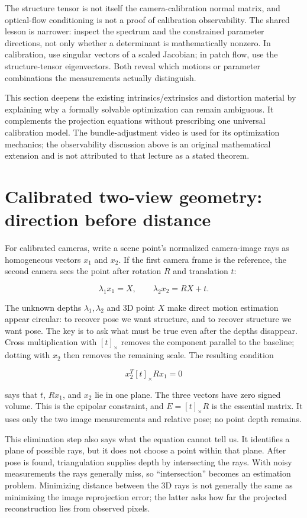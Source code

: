 The structure tensor is not itself the camera-calibration normal matrix, and optical-flow conditioning is not a proof of calibration observability. The shared lesson is narrower: inspect the spectrum and the constrained parameter directions, not only whether a determinant is mathematically nonzero. In calibration, use singular vectors of a scaled Jacobian; in patch flow, use the structure-tensor eigenvectors. Both reveal which motions or parameter combinations the measurements actually distinguish.

This section deepens the existing intrinsics/extrinsics and distortion material by explaining why a formally solvable optimization can remain ambiguous. It complements the projection equations without prescribing one universal calibration model. The bundle-adjustment video is used for its optimization mechanics; the observability discussion above is an original mathematical extension and is not attributed to that lecture as a stated theorem.

\section{Calibrated two-view geometry: direction before distance}\label{02-foundations-ii-ch036-calibrated-two-view-geometry-direction-before-distance}

For calibrated cameras, write a scene point's normalized camera-image rays as homogeneous vectors \(x_1\) and \(x_2\). If the first camera frame is the reference, the second camera sees the point after rotation \(R\) and translation \(t\):

\[\lambda_1x_1=X,\qquad \lambda_2x_2=RX+t.\]

The unknown depths \(\lambda_1,\lambda_2\) and 3D point \(X\) make direct motion estimation appear circular: to recover pose we want structure, and to recover structure we want pose. The key is to ask what must be true even after the depths disappear. Cross multiplication with \([t]_\times\) removes the component parallel to the baseline; dotting with \(x_2\) then removes the remaining scale. The resulting condition

\[x_2^T[t]_\times R x_1=0\]

says that \(t\), \(Rx_1\), and \(x_2\) lie in one plane. The three vectors have zero signed volume. This is the epipolar constraint, and \(E=[t]_\times R\) is the essential matrix. It uses only the two image measurements and relative pose; no point depth remains.

This elimination step also says what the equation cannot tell us. It identifies a plane of possible rays, but it does not choose a point within that plane. After pose is found, triangulation supplies depth by intersecting the rays. With noisy measurements the rays generally miss, so ``intersection'' becomes an estimation problem. Minimizing distance between the 3D rays is not generally the same as minimizing the image reprojection error; the latter asks how far the projected reconstruction lies from observed pixels.

